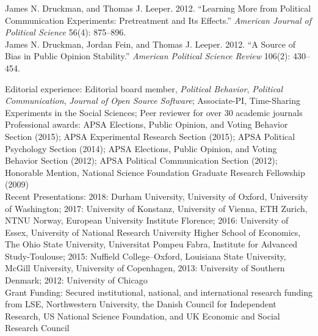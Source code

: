 \documentclass[12pt]{article}
\renewcommand{\section}[1]{\pagebreak[3]%
    \llap{\scshape\smash{\parbox[t]{\marginparwidth}{\raggedright {\color{black}#1}}}}%
    \vspace{-\baselineskip}\par}
\newcommand{\entry}[1]{\indent {\color{lg}\guillemotright}\hspace{2pt}#1\vspace{.25em}\\}
\newcommand{\hzline}[0]{\noindent\makebox[\linewidth]{\rule{\textwidth}{0.4pt}}}
\begin{document}
	\entry{James N. Druckman, and Thomas J. Leeper. 2012. ``Learning More from Political Communication Experiments: Pretreatment and Its Effects.'' {\em American Journal of Political Science} 56(4): 875--896.}
	\entry{James N. Druckman, Jordan Fein, and Thomas J. Leeper. 2012. ``A Source of Bias in Public Opinion Stability.'' {\em American Political Science Review} 106(2): 430--454.}
\hzline

\section{Other Relevant Experience}
\entry{Editorial experience: Editorial board member, \textit{Political Behavior}, \textit{Political Communication}, \textit{Journal of Open Source Software}; Associate-PI, Time-Sharing Experiments in the Social Sciences; Peer reviewer for over 30 academic journals}
\entry{Professional awards: APSA Elections, Public Opinion, and Voting Behavior Section (2015); APSA Experimental Research Section (2015); APSA Political Psychology Section (2014); APSA Elections, Public Opinion, and Voting Behavior Section (2012); APSA Political Communication Section (2012); Honorable Mention, National Science Foundation Graduate Research Fellowship (2009)}
\entry{Recent Presentations: 2018: Durham University, University of Oxford, University of Washington; 2017: University of Konstanz, University of Vienna, ETH Zurich, NTNU Norway, European University Institute Florence; 2016: University of Essex, University of National Research University Higher School of Economics, The Ohio State University, Universitat Pompeu Fabra, Institute for Advanced Study-Toulouse; 2015: Nuffield College--Oxford, Louisiana State University, McGill University, University of Copenhagen, 2013: University of Southern Denmark; 2012: University of Chicago}
\entry{Grant Funding: Secured institutional, national, and international research funding from LSE, Northwestern University, the Danish Council for Independent Research, US National Science Foundation, and UK Economic and Social Research Council}
\hzline
\end{document}
